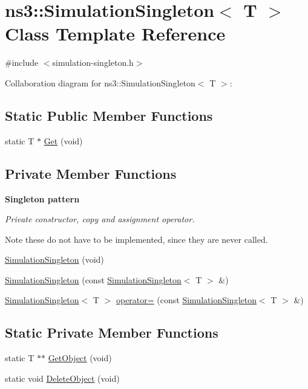 \hypertarget{classns3_1_1SimulationSingleton}{}\section{ns3\+:\+:Simulation\+Singleton$<$ T $>$ Class Template Reference}
\label{classns3_1_1SimulationSingleton}


{\ttfamily \#include $<$simulation-\/singleton.\+h$>$}



Collaboration diagram for ns3\+:\+:Simulation\+Singleton$<$ T $>$\+:
\subsection*{Static Public Member Functions}
\begin{DoxyCompactItemize}
\item 
static T $\ast$ \hyperlink{classns3_1_1SimulationSingleton_a35870bf2664aaa6e653ce99fb68fc8fc}{Get} (void)
\end{DoxyCompactItemize}
\subsection*{Private Member Functions}
\begin{Indent}{\bf Singleton pattern}\par
{\em Private constructor, copy and assignment operator.

Note these do not have to be implemented, since they are never called. }\begin{DoxyCompactItemize}
\item 
\hyperlink{classns3_1_1SimulationSingleton_a48641effbb881a735ac60891d6cd8379}{Simulation\+Singleton} (void)
\item 
\hyperlink{classns3_1_1SimulationSingleton_aa30520f412a11df735e6e02aaa6dcb96}{Simulation\+Singleton} (const \hyperlink{classns3_1_1SimulationSingleton}{Simulation\+Singleton}$<$ T $>$ \&)
\item 
\hyperlink{classns3_1_1SimulationSingleton}{Simulation\+Singleton}$<$ T $>$ \hyperlink{classns3_1_1SimulationSingleton_ae1321bbc20baa52e14652a2ca5268672}{operator=} (const \hyperlink{classns3_1_1SimulationSingleton}{Simulation\+Singleton}$<$ T $>$ \&)
\end{DoxyCompactItemize}
\end{Indent}
\subsection*{Static Private Member Functions}
\begin{DoxyCompactItemize}
\item 
static T $\ast$$\ast$ \hyperlink{classns3_1_1SimulationSingleton_af2e92e3e42ce82eb842d904d4a47e31c}{Get\+Object} (void)
\item 
static void \hyperlink{classns3_1_1SimulationSingleton_a7db717eb326f748e80b19a66574fbf47}{Delete\+Object} (void)
\end{DoxyCompactItemize}


